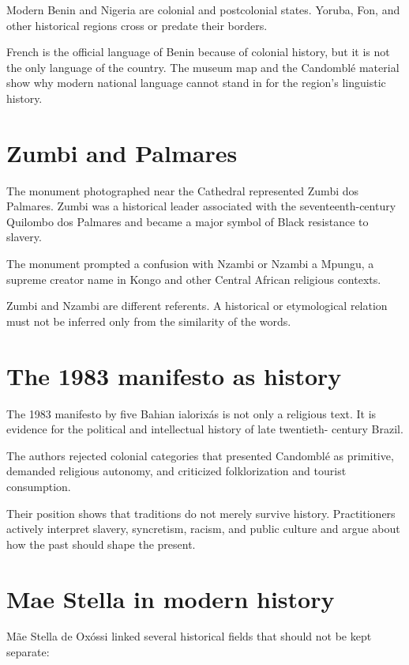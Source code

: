 Modern Benin and Nigeria are colonial and
postcolonial states.  Yoruba, Fon, and
other historical regions cross or predate
their borders.

French is the official language of Benin
because of colonial history, but it is not
the only language of the country.  The
museum map and the Candombl\'e material
show why modern national language cannot
stand in for the region's linguistic
history.

\section{Zumbi and Palmares}
\label{section-zumbi-palmares}

The monument photographed near the
Cathedral represented Zumbi dos Palmares.
Zumbi was a historical leader associated
with the seventeenth-century Quilombo dos
Palmares and became a major symbol of Black
resistance to slavery.

The monument prompted a confusion with
Nzambi or Nzambi a Mpungu, a supreme
creator name in Kongo and other Central
African religious contexts.

Zumbi and Nzambi are different referents.
A historical or etymological relation must
not be inferred only from the similarity
of the words.

\section{The 1983 manifesto as history}
\label{section-history-manifesto}

The 1983 manifesto by five Bahian
ialorix\'as is not only a religious text.
It is evidence for the political and
intellectual history of late twentieth-
century Brazil.

The authors rejected colonial categories
that presented Candombl\'e as primitive,
demanded religious autonomy, and criticized
folklorization and tourist consumption.

Their position shows that traditions do
not merely survive history.  Practitioners
actively interpret slavery, syncretism,
racism, and public culture and argue about
how the past should shape the present.

\section{Mae Stella in modern history}
\label{section-history-mae-stella}

M\~ae Stella de Ox\'ossi linked several
historical fields that should not be kept
separate:

